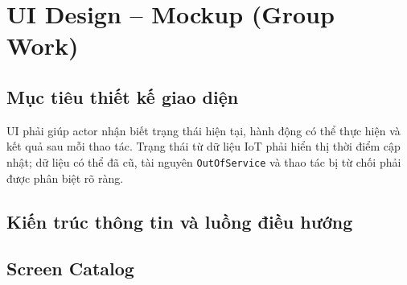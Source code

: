 \section{UI Design -- Mockup (Group Work)}

\subsection{Mục tiêu thiết kế giao diện}

UI phải giúp actor nhận biết trạng thái hiện tại, hành động có thể thực hiện và kết quả sau mỗi thao tác. Trạng thái từ dữ liệu IoT phải hiển thị thời điểm cập nhật; dữ liệu có thể đã cũ, tài nguyên \texttt{OutOfService} và thao tác bị từ chối phải được phân biệt rõ ràng.

\subsection{Kiến trúc thông tin và luồng điều hướng}



\subsection{Screen Catalog}


